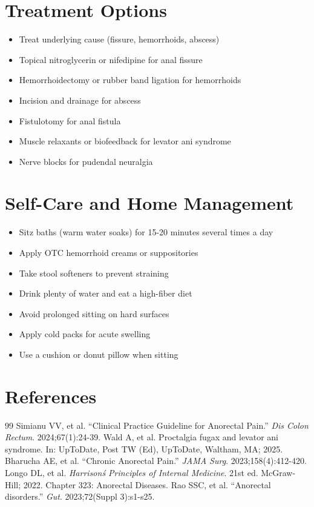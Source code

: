\section*{Treatment Options}
\begin{itemize}
\item Treat underlying cause (fissure, hemorrhoids, abscess)
\item Topical nitroglycerin or nifedipine for anal fissure
\item Hemorrhoidectomy or rubber band ligation for hemorrhoids
\item Incision and drainage for abscess
\item Fistulotomy for anal fistula
\item Muscle relaxants or biofeedback for levator ani syndrome
\item Nerve blocks for pudendal neuralgia
\end{itemize}

\section*{Self-Care and Home Management}
\begin{itemize}
\item Sitz baths (warm water soaks) for 15-20 minutes several times a day
\item Apply OTC hemorrhoid creams or suppositories
\item Take stool softeners to prevent straining
\item Drink plenty of water and eat a high-fiber diet
\item Avoid prolonged sitting on hard surfaces
\item Apply cold packs for acute swelling
\item Use a cushion or donut pillow when sitting
\end{itemize}

\section*{References}
\begin{thebibliography}{99}
 Simianu VV, et al. ``Clinical Practice Guideline for Anorectal Pain.'' \emph{Dis Colon Rectum}. 2024;67(1):24-39.
 Wald A, et al. Proctalgia fugax and levator ani syndrome. In: UpToDate, Post TW (Ed), UpToDate, Waltham, MA; 2025.
 Bharucha AE, et al. ``Chronic Anorectal Pain.'' \emph{JAMA Surg}. 2023;158(4):412-420.
 Longo DL, et al. \emph{Harrison\'s Principles of Internal Medicine}. 21st ed. McGraw-Hill; 2022. Chapter 323: Anorectal Diseases.
 Rao SSC, et al. ``Anorectal disorders.'' \emph{Gut}. 2023;72(Suppl 3):s1-s25.
\end{thebibliography}
